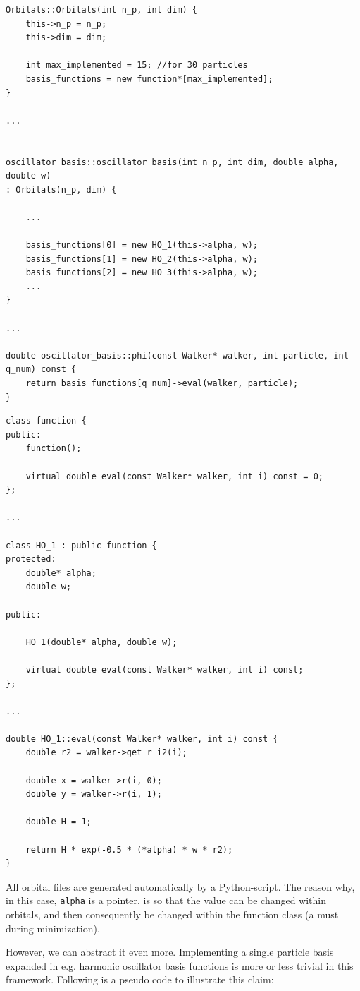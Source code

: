 \vspace{0.5cm}
\begin{lstlisting}
Orbitals::Orbitals(int n_p, int dim) {
    this->n_p = n_p;
    this->dim = dim;

    int max_implemented = 15; //for 30 particles
    basis_functions = new function*[max_implemented];
}

...


oscillator_basis::oscillator_basis(int n_p, int dim, double alpha, double w)
: Orbitals(n_p, dim) {

    ...

    basis_functions[0] = new HO_1(this->alpha, w);
    basis_functions[1] = new HO_2(this->alpha, w);
    basis_functions[2] = new HO_3(this->alpha, w);
    ...
}

...

double oscillator_basis::phi(const Walker* walker, int particle, int q_num) const {
    return basis_functions[q_num]->eval(walker, particle);
}
\end{lstlisting}

\begin{lstlisting}
class function {
public:
    function();
    
    virtual double eval(const Walker* walker, int i) const = 0;
};

...

class HO_1 : public function {
protected:
    double* alpha;
    double w;

public:

    HO_1(double* alpha, double w);

    virtual double eval(const Walker* walker, int i) const;
};

...

double HO_1::eval(const Walker* walker, int i) const {
    double r2 = walker->get_r_i2(i);

    double x = walker->r(i, 0);
    double y = walker->r(i, 1);

    double H = 1;
    
    return H * exp(-0.5 * (*alpha) * w * r2);
}
\end{lstlisting}

All orbital files are generated automatically by a Python-script. The reason why, in this case, \verb+alpha+ is a pointer, is so that the value can be changed within orbitals, and then consequently be changed within the function class (a must during minimization). 

However, we can abstract it even more. Implementing a single particle basis expanded in e.g. harmonic oscillator basis functions is more or less trivial in this framework. Following is a pseudo code to illustrate this claim:

